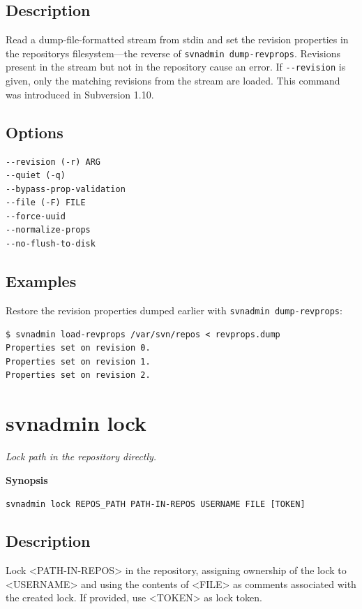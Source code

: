 \subsection{Description}

Read a dump-file-formatted stream from stdin and set the revision
properties in the repository\textquotesingle s filesystem---the reverse
of \texttt{svnadmin\ dump-revprops}. Revisions present in the stream but
not in the repository cause an error. If \texttt{-\/-revision} is given,
only the matching revisions from the stream are loaded. This command was
introduced in Subversion 1.10.

\subsection{Options}

\begin{verbatim}
--revision (-r) ARG
--quiet (-q)
--bypass-prop-validation
--file (-F) FILE
--force-uuid
--normalize-props
--no-flush-to-disk
\end{verbatim}

\subsection{Examples}

Restore the revision properties dumped earlier with
\texttt{svnadmin\ dump-revprops}:

\begin{verbatim}
$ svnadmin load-revprops /var/svn/repos < revprops.dump
Properties set on revision 0.
Properties set on revision 1.
Properties set on revision 2.
\end{verbatim}

\section{svnadmin lock}\label{svn.ref.svnadmin.c.lock}

\emph{Lock path in the repository directly.}

\textbf{Synopsis}

\texttt{svnadmin\ lock\ REPOS\_PATH\ PATH-IN-REPOS\ USERNAME\ FILE\ {[}TOKEN{]}}

\subsection{Description}

Lock \textless PATH-IN-REPOS\textgreater{} in the repository, assigning
ownership of the lock to \textless USERNAME\textgreater{} and using the
contents of \textless FILE\textgreater{} as comments associated with the
created lock. If provided, use \textless TOKEN\textgreater{} as lock
token.

